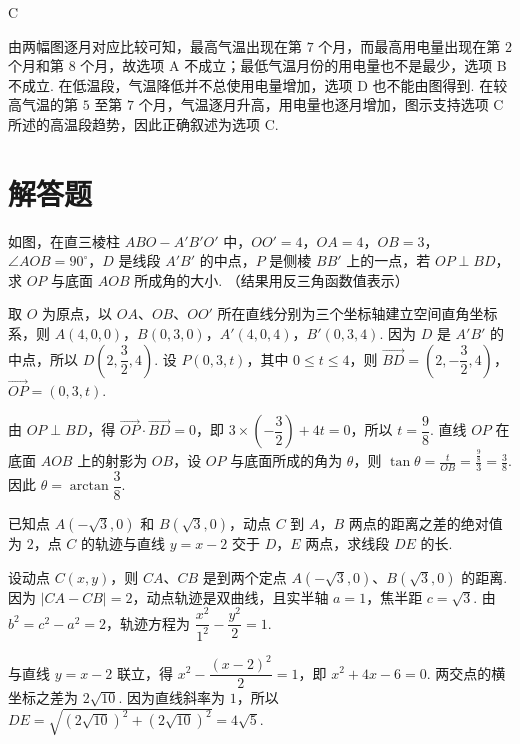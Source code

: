 \begin{answer}
C
\end{answer}

\begin{solution}
由两幅图逐月对应比较可知，最高气温出现在第 \(7\) 个月，而最高用电量出现在第 \(2\) 个月和第 \(8\) 个月，故选项 A 不成立；最低气温月份的用电量也不是最少，选项 B 不成立. 在低温段，气温降低并不总使用电量增加，选项 D 也不能由图得到. 在较高气温的第 \(5\) 至第 \(7\) 个月，气温逐月升高，用电量也逐月增加，图示支持选项 C 所述的高温段趋势，因此正确叙述为选项 C.
\end{solution}

\section{解答题}
\begin{problem}
如图，在直三棱柱 \(ABO-A'B'O'\) 中，\(OO' = 4\)，\(OA = 4\)，\(OB = 3\)，\(\angle AOB = 90^\circ\)，\(D\) 是线段 \(A'B'\) 的中点，\(P\) 是侧棱 \(BB'\) 上的一点，若 \(OP \perp BD\)，求 \(OP\) 与底面 \(AOB\) 所成角的大小. （结果用反三角函数值表示）

\end{problem}

\begin{solution}
取 \(O\) 为原点，以 \(OA\)、\(OB\)、\(OO'\) 所在直线分别为三个坐标轴建立空间直角坐标系，则
\(A(4,0,0)\)，\(B(0,3,0)\)，\(A'(4,0,4)\)，\(B'(0,3,4)\). 因为 \(D\) 是 \(A'B'\) 的中点，所以 \(D\left(2,\dfrac{3}{2},4\right)\). 设 \(P(0,3,t)\)，其中 \(0\leqslant t\leqslant4\)，则 \(\overrightarrow{BD}=\left(2,-\dfrac{3}{2},4\right)\)，\(\overrightarrow{OP}=(0,3,t)\).

由 \(OP\perp BD\)，得 \(\overrightarrow{OP}\cdot\overrightarrow{BD}=0\)，即 \(3\times\left(-\dfrac{3}{2}\right)+4t=0\)，所以 \(t=\dfrac{9}{8}\). 直线 \(OP\) 在底面 \(AOB\) 上的射影为 \(OB\)，设 \(OP\) 与底面所成的角为 \(\theta\)，则
\(\displaystyle\tan\theta=\frac{t}{OB}=\frac{\frac{9}{8}}{3}=\frac{3}{8}\). 因此 \(\theta=\arctan\dfrac{3}{8}\).
\end{solution}

\begin{problem}
已知点 \(A(-\sqrt{3},0)\) 和 \(B(\sqrt{3},0)\)，动点 \(C\) 到 \(A\)，\(B\) 两点的距离之差的绝对值为 \(2\)，点 \(C\) 的轨迹与直线 \(y = x - 2\) 交于 \(D\)，\(E\) 两点，求线段 \(DE\) 的长.
\end{problem}

\begin{solution}
设动点 \(C(x,y)\)，则 \(CA\)、\(CB\) 是到两个定点 \(A(-\sqrt{3},0)\)、\(B(\sqrt{3},0)\) 的距离. 因为 \(|CA-CB|=2\)，动点轨迹是双曲线，且实半轴 \(a=1\)，焦半距 \(c=\sqrt{3}\). 由 \(b^2=c^2-a^2=2\)，轨迹方程为 \(\dfrac{x^2}{1^2}-\dfrac{y^2}{2}=1\).

与直线 \(y=x-2\) 联立，得 \(x^2-\dfrac{(x-2)^2}{2}=1\)，即 \(x^2+4x-6=0\). 两交点的横坐标之差为 \(2\sqrt{10}\). 因为直线斜率为 \(1\)，所以
\(\displaystyle DE=\sqrt{(2\sqrt{10})^2+(2\sqrt{10})^2}=4\sqrt{5}\).
\end{solution}

